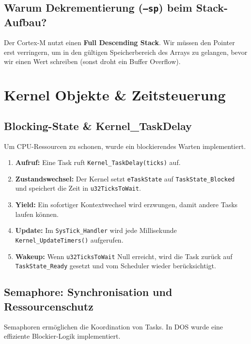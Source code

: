 \documentclass[11pt,a4paper]{article}
\begin{document}
\subsection{Warum Dekrementierung (\texttt{--sp}) beim Stack-Aufbau?}
Der Cortex-M nutzt einen \textbf{Full Descending Stack}. Wir müssen den Pointer erst verringern, um in den gültigen Speicherbereich des Arrays zu gelangen, bevor wir einen Wert schreiben (sonst droht ein Buffer Overflow).

\section{Kernel Objekte \& Zeitsteuerung}

\subsection{Blocking-State \& Kernel\_TaskDelay}
Um CPU-Ressourcen zu schonen, wurde ein blockierendes Warten implementiert.
\begin{enumerate}
    \item \textbf{Aufruf:} Eine Task ruft \texttt{Kernel\_TaskDelay(ticks)} auf.
    \item \textbf{Zustandswechsel:} Der Kernel setzt \texttt{eTaskState} auf \texttt{TaskState\_Blocked} und speichert die Zeit in \texttt{u32TicksToWait}.
    \item \textbf{Yield:} Ein sofortiger Kontextwechsel wird erzwungen, damit andere Tasks laufen können.
    \item \textbf{Update:} Im \texttt{SysTick\_Handler} wird jede Millisekunde \texttt{Kernel\_UpdateTimers()} aufgerufen.
    \item \textbf{Wakeup:} Wenn \texttt{u32TicksToWait} Null erreicht, wird die Task zurück auf \texttt{TaskState\_Ready} gesetzt und vom Scheduler wieder berücksichtigt.
\end{enumerate}

\subsection{Semaphore: Synchronisation und Ressourcenschutz}
Semaphoren ermöglichen die Koordination von Tasks. In DOS wurde eine effiziente Blockier-Logik implementiert.
\end{document}
